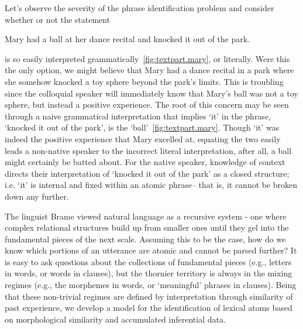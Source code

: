 Let's observe the severity of the phrase identification problem and
consider whether or not the statement
\begin{center}
\begin{minipage}{.9\linewidth}
\center
Mary had a ball at her dance recital and knocked it out of the park.
\end{minipage}
\end{center}
is so easily interpreted grammatically~\ref{fig:textpart.mary}, or literally.
Were this the only option, we might believe that Mary had a dance
recital in a park where she somehow knocked a toy sphere beyond the
park's limits. This is troubling since the colloquial speaker will
immediately know that Mary's ball was not a toy sphere, but instead a
positive experience. The root of this concern may be seen through a
naive grammatical interpretation that implies `it' in the phrase,
`knocked it out of the park', is the `ball'~\ref{fig:textpart.mary}. 
Though `it'
was indeed the positive experience that Mary excelled at, equating the
two easily leads a non-native speaker to the incorrect literal
interpretation, after all, a ball might certainly be batted about. For
the native speaker, knowledge of context directs their interpretation
of `knocked it out of the park' as a closed structure; i.e. `it' is
internal and fixed within an atomic phrase-- that is, it cannot be
broken down any further.

The linguist Brame \cite{Brame01} viewed natural language as a
recursive system - one where complex relational structures build up
from smaller ones until they gel into the fundamental pieces of the
next scale. Assuming this to be the case, how do we know which
portions of an utterance are atomic and cannot be parsed further? It
is easy to ask questions about the collections of fundamental pieces
(e.g., letters in words, or words in clauses), but the thornier
territory is always in the mixing regimes (e.g., the morphemes in
words, or `meaningful' phrases in clauses). Being that these
non-trivial regimes are defined by interpretation through similarity
of past experience, we develop a model for the identification of
lexical atoms based on morphological similarity and accumulated
inferential data.

